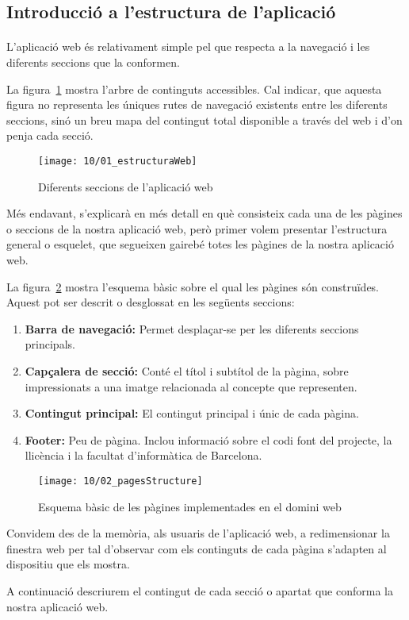 \subsection{Introducció a l'estructura de l'aplicació}\label{sec:introStructure}

    \paragraph{}
    L'aplicació web és relativament simple pel que respecta a la navegació i les diferents seccions que la conformen.

    La figura~\ref{fig:webStructure} mostra l'arbre de continguts accessibles. Cal indicar, que aquesta figura no representa les úniques rutes de navegació existents entre les diferents seccions, sinó un breu mapa del contingut total disponible a través del web i d’on penja cada secció.

    \begin{figure}[h]
        \texttt{[image: 10/01\_estructuraWeb]}
        \centering
        \caption{Diferents seccions de l'aplicació web}\label{fig:webStructure}
    \end{figure}

    Més endavant, s’explicarà en més detall en què consisteix cada una de les pàgines o seccions de la nostra aplicació web, però primer volem presentar l'estructura general o esquelet, que segueixen gairebé totes les pàgines de la nostra aplicació web.

    La figura~\ref{fig:pageStructure} mostra l'esquema bàsic sobre el qual les pàgines són construïdes. Aquest pot ser descrit o desglossat en les següents seccions:

    \begin{enumerate}
        \item \textbf{Barra de navegació:} Permet desplaçar-se per les diferents seccions principals.
        \item \textbf{Capçalera de secció:} Conté el títol i subtítol de la pàgina, sobre im\-pre\-ssio\-nats a una imatge relacionada al concepte que representen.
        \item \textbf{Contingut principal:} El contingut principal i únic de cada pàgina.
        \item \textbf{Footer:} Peu de pàgina. Inclou informació sobre el codi font del projecte, la llicència i la facultat d'informàtica de Barcelona.
    \end{enumerate}

    \begin{figure}[h]
        \texttt{[image: 10/02\_pagesStructure]}
        \centering
        \caption{Esquema bàsic de les pàgines implementades en el domini web}\label{fig:pageStructure}
    \end{figure}

    Convidem des de la memòria, als usuaris de l'aplicació web, a redimensionar la finestra web per tal d'observar com els continguts de cada pàgina s’adapten al dispositiu que els mostra.

    A continuació descriurem el contingut de cada secció o apartat que conforma la nostra aplicació web.
